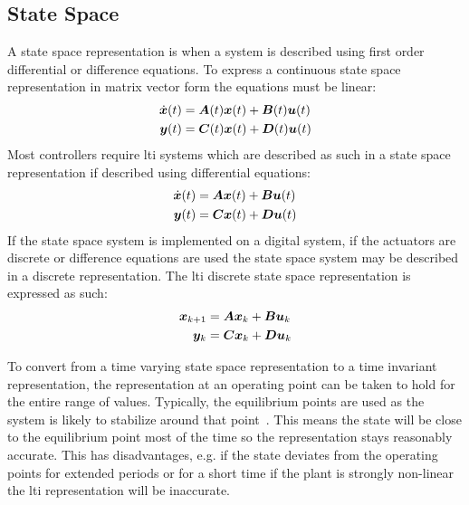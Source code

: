 \subsection{State Space}
\label{sec:StateSpace}

A state space representation is when a system is described using first order differential or difference equations. To express a continuous state space representation in matrix vector form the equations must be linear:
\begin{align}
    \dot{\bm x}(t) &= \bm A(t)\bm x(t) + \bm B(t) \bm u(t) \\
    \bm y(t) &= \bm C(t)\bm x(t) + \bm D(t) \bm u(t)
\end{align}
Most controllers require \gls{lti} systems which are described as such in a state space representation if described using differential equations:
\begin{align}
    \label{eq:ltistate}
    \dot{\bm x}(t) &= \bm A \bm x(t) + \bm B \bm u(t) \\
    \label{eq:ltioutput}
    \bm y(t) &= \bm C \bm x(t) + \bm D \bm u(t)
\end{align}
If the state space system is implemented on a digital system, if the actuators are discrete or difference equations are used the state space system may be described in a discrete representation.
The \gls{lti} discrete state space representation is expressed as such:
\begin{align}
    \bm x_{k+1} &= \bm A \bm x_k + \bm B \bm u_k \\
    \bm y_k &= \bm C \bm x_k + \bm D \bm u_k
\end{align}

To convert from a time varying state space representation to a time invariant representation, the representation at an operating point can be taken to hold for the entire range of values.
Typically, the equilibrium points are used as the system is likely to stabilize around that point~\cite{MITFEEDBACK}. This means the state will be close to the equilibrium point most of the time so the representation stays reasonably accurate. 
This has disadvantages, e.g. if the state deviates from the operating points for extended periods or for a short time if the plant is strongly non-linear the \gls{lti} representation will be inaccurate.

